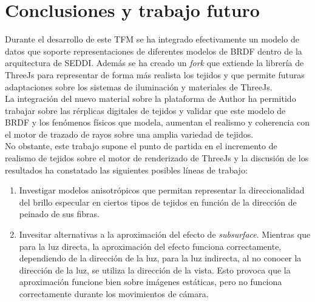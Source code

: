 \chapter{Conclusiones y trabajo futuro}

Durante el desarrollo de este TFM se ha integrado efectivamente un modelo de datos que soporte representaciones de diferentes modelos de BRDF dentro de la arquitectura de SEDDI.
Adem\'as se ha creado un \textit{fork} que extiende la librer\'ia de ThreeJs para representar de forma m\'as realista los tejidos y que permite futuras adaptaciones sobre los
sistemas de iluminaci\'on y materiales de ThreeJs.\\

La integraci\'on del nuevo material sobre la plataforma de Author ha permitido trabajar sobre las r\'erplicas digitales de tejidos
y validar que este modelo de BRDF y los fen\'omenos f\'isicos que modela, aumentan el realismo y coherencia
con el motor de trazado de rayos sobre una amplia variedad de tejidos.\\

No obstante, este trabajo supone el punto de partida en el incremento de realismo de tejidos sobre el motor de renderizado de ThreeJs
y la discusi\'on de los resultados ha constatado las siguientes posibles l\'ineas de trabajo:

\begin{enumerate}
	\item Investigar modelos anisotr\'opicos que permitan representar la direccionalidad del brillo especular en ciertos
    tipos de tejidos en funci\'on de la direcci\'on de peinado de sus fibras.
    \item Invesitar alternativas a la aproximaci\'on del efecto de \textit{subsurface}. Mientras que para la luz directa,
    la aproximaci\'on del efecto funciona correctamente, dependiendo de la direcci\'on de la luz, para la luz indirecta,
    al no conocer la direcci\'on de la luz, se utiliza la direcci\'on de la vista. Esto provoca que la aproximaci\'on
    funcione bien sobre im\'agenes est\'aticas, pero no funciona correctamente durante los movimientos de c\'amara.
\end{enumerate}





